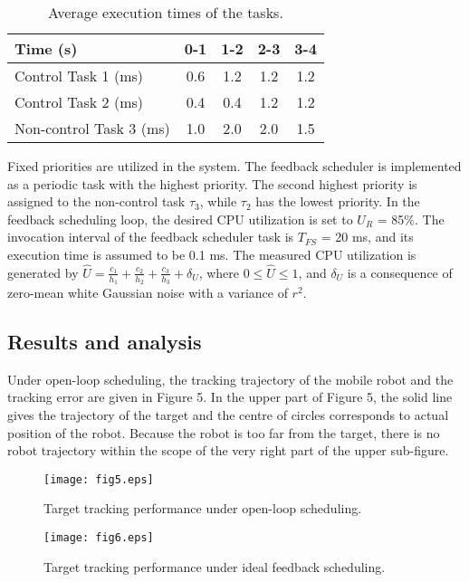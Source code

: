 \documentclass[12pt,a4paper]{ijicic}
\begin{document}
\begin{table}[htb!]
\begin{center}
\caption{Average execution times of the tasks.}
\label{table3}
\begin{tabular}{lcccc}
\hline
Time (s) & 0-1 & 1-2 & 2-3 & 3-4 \\
\hline
Control Task 1 (ms) & 0.6 & 1.2 & 1.2 & 1.2 \\
Control Task 2 (ms) & 0.4 & 0.4 & 1.2 & 1.2 \\
Non-control Task 3 (ms) & 1.0 & 2.0 & 2.0 & 1.5 \\
\hline
\end{tabular}
\end{center}
\end{table}

Fixed priorities are utilized in the system. The feedback scheduler is
implemented as a periodic task with the highest priority. The second
highest priority is assigned to the non-control task $\tau_3$, while $\tau_2$
has the lowest priority. In the feedback scheduling loop, the desired CPU
utilization is set to $U_R$ = 85\%. The invocation interval of the feedback
scheduler task is $T_{FS}$ = 20 ms, and its execution time is assumed to be 0.1 ms.
The measured CPU utilization is generated by $\hat{U}=\frac{c_1}{h_1}+\frac{c_2}{h_2}+\frac{c_3}{h_3}+\delta_U$,
where $0\leq \hat{U}\leq1$, and $\delta_U$ is a consequence of zero-mean white
Gaussian noise with a variance of $r^2$.

\subsection{Results and analysis}
Under open-loop scheduling, the tracking trajectory of the mobile
robot and the tracking error are given in Figure 5. In the upper
part of Figure 5, the solid line gives the trajectory of the target
and the centre of circles corresponds to actual position of the
robot. Because the robot is too far from the target, there is no
robot trajectory within the scope of the very right part of the
upper sub-figure.

\begin{figure}[htb!]
\begin{minipage}[t]{0.47\textwidth} \centering
\texttt{[image: fig5.eps]}
\caption{Target tracking performance under open-loop scheduling.}
\label{fig:5}
\end{minipage}\begin{minipage}[t]{0.47\textwidth}
\texttt{[image: fig6.eps]}
\caption{Target tracking performance under ideal feedback scheduling.}
\label{fig:6}
\end{minipage}
\end{figure}
\end{document}
